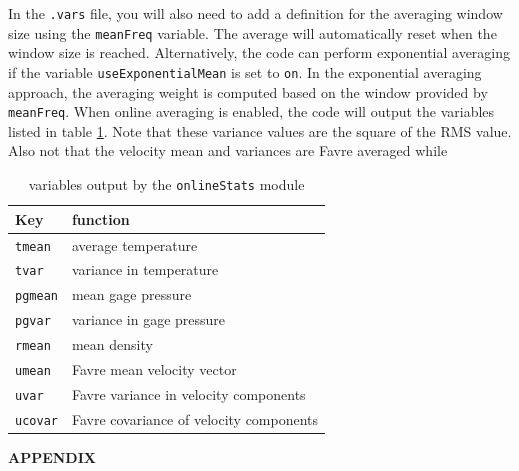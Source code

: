 \documentclass{article}
\begin{document}
In the {\tt .vars} file, you will also need to add a definition for
the averaging window size using the {\tt meanFreq} variable.  The
average will automatically reset when the window size is reached.
Alternatively, the code can perform exponential averaging if the
variable {\tt useExponentialMean} is set to {\tt on}.  In the
exponential averaging approach, the averaging weight is computed based
on the window provided by {\tt meanFreq}.  When online averaging is
enabled, the code will output the variables listed in table
\ref{tab:onlinestats}.  Note that these variance values are the square
of the RMS value.  Also not that the velocity mean and variances are
Favre averaged while

\begin{table}[htbp]
  \begin{center}
    
    \leavevmode
    \begin{tabular}{|l|l|}
      \hline
      Key & function \\
      \hline
      {\tt tmean} & average temperature \\
      {\tt tvar} & variance in temperature \\
      {\tt pgmean} & mean gage pressure \\
      {\tt pgvar} & variance in gage pressure\\
      {\tt rmean} & mean density\\
      {\tt umean} & Favre mean velocity vector\\
      {\tt uvar} & Favre variance in velocity components\\
      {\tt ucovar} & Favre covariance of velocity components\\
      \hline
    \end{tabular}
    
    \caption{variables output by the {\tt onlineStats} module}
    \label{tab:onlinestats}
  \end{center}
\end{table}




\clearpage
\appendix
\def\V{\mathcal{V}}
\def\A{\mathcal{A}}

\begin{center}
{\huge \bf APPENDIX}
\end{center}





\end{document}
